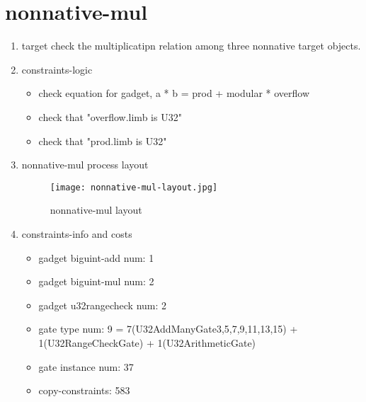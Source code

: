 \section{nonnative-mul}
\label{nonnative-mul}

\begin{enumerate}
    \item target
        check the multiplicatipn relation among three nonnative target objects.
    \item constraints-logic
        \begin{itemize}
            \item check equation for gadget,  a * b = prod + modular * overflow
            \item check that "overflow.limb is U32"
            \item check that "prod.limb is U32"
        \end{itemize}
    \item nonnative-mul process layout
        \begin{figure}[!ht]
            \centering
            \texttt{[image: nonnative-mul-layout.jpg]}
            \caption{nonnative-mul layout}
            \label{fig:nonnative-mul-layout}
        \end{figure}
    
    \item constraints-info and costs
        \begin{itemize}
            \item gadget biguint-add num: 1
            \item gadget biguint-mul num: 2
            \item gadget u32rangecheck num: 2
            \item gate type num: 9 = 7(U32AddManyGate{3,5,7,9,11,13,15}) + 1(U32RangeCheckGate) + 1(U32ArithmeticGate)
            \item gate instance num: 37
            \item copy-constraints: 583
        \end{itemize}

\end{enumerate}